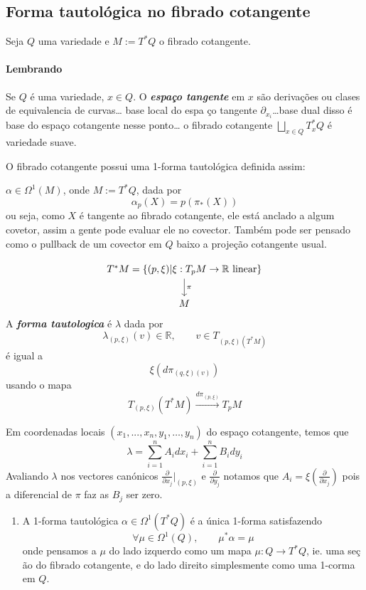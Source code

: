 \subsection{Forma tautol\'ogica no fibrado cotangente}

Seja $Q$ uma variedade e $M :=T^* Q$ o fibrado cotangente.

\paragraph{Lembrando} Se $Q$ \'e uma variedade, $x\in Q$. O \textit{\textbf{espa\c co tangente}} em $ x$ s\~ao derivaç\~oes ou clases de equivalencia de curvas… base local do espa \c co tangente $\partial_{x_i}$…base dual disso \'e base do espa\c co cotangente nesse ponto… o fibrado cotangente $\bigsqcup_{x\in Q}T^*_{x}Q$ \'e variedade suave.

O fibrado cotangente possui uma 1-forma tautol\'ogica definida assim:

\begin{defn}
	$\alpha\in\Omega^{1}(M)$, onde $M:=T^*Q$, dada por
	\[\alpha_p(X)=p(\pi_*(X))\]
	ou seja, como $X$ \'e tangente ao fibrado cotangente, ele est\'a anclado a algum covetor, assim a gente pode evaluar ele no covector. Tamb\'em pode ser pensado como o pullback de um covector em $Q$ baixo a proje\c c\~ao cotangente usual.
\end{defn}

\begin{defn}[Monitoria]
	\[\begin{tikzcd}
		T^*M=\{(p,\xi)|\xi:T_pM\to \mathbb{R}\text{ linear} \} \arrow[d,"\pi"]\\
		M
	\end{tikzcd}\]
	A \textit{\textbf{forma tautologica}}  \'e $\lambda$ dada por
	\[\lambda_{(p,\xi)}(v)\in\mathbb{R},\qquad v\in T_{(p,\xi)(T^*M)}\]
	\'e igual a
	\[\xi(d\pi_{(q,\xi)(v)})\]
	usando o mapa
\[T_{(p,\xi)}(T^* M)\overset{d\pi_{(p,\xi)}}{\longrightarrow}T_{p}M\]
\end{defn}

Em coordenadas locais $(x_1,...,x_n,y_1,\ldots,y_n)$ do espaço cotangente, temos que
\[\lambda=\sum_{i=1}^nA_i dx_i+\sum_{i=1}^nB_i dy_i\]
Avaliando $\lambda$ nos vectores can\'onicos $\frac{\partial}{\partial x_j}\Big|_{(p,\xi)}$ e $\frac{\partial}{\partial y_j}$ notamos que $A_i=\xi\left( \frac{\partial}{\partial x_j} \right) $ pois a diferencial de $\pi$ faz as $B_j$ ser zero.

\begin{exercise}\leavevmode 
	\begin{enumerate}
		\item A 1-forma tautol\'ogica $\alpha\in\Omega^{1}(T^*Q)$ \'e a \'unica 1-forma satisfazendo
			\[\forall \mu\in\Omega^{1}(Q),\qquad \mu^*\alpha=\mu\]
			onde pensamos a $\mu$ do lado izquerdo como um mapa  $\mu:Q\to T^*Q$, ie. uma se\c c \~ao do fibrado cotangente, e do lado direito simplesmente como uma 1-corma em $Q$.

	\end{enumerate}
\end{exercise}

